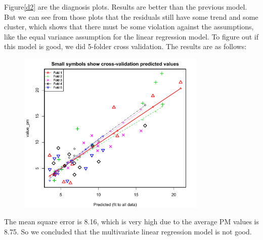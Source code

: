 \documentclass[10pt]{article}
\begin{document}
Figure\ref{d2} are the diagnosis plots. Results are better than the previous model. But we can see from those plots that the residuals still have some trend and some cluster, which shows that there must be some violation against the assumptions, like the equal variance assumption for the linear regression model. To figure out if this model is good, we did 5-folder cross validation. The results are as follows:

\begin{figure}[ht!]
\centering
\includegraphics[width = 90mm]{cv_lm.pdf}
\caption{}
\end{figure}

The mean square error is 8.16, which is very high due to the average PM values is 8.75. So we concluded that the multivariate linear regression model is not good.
\end{document}
